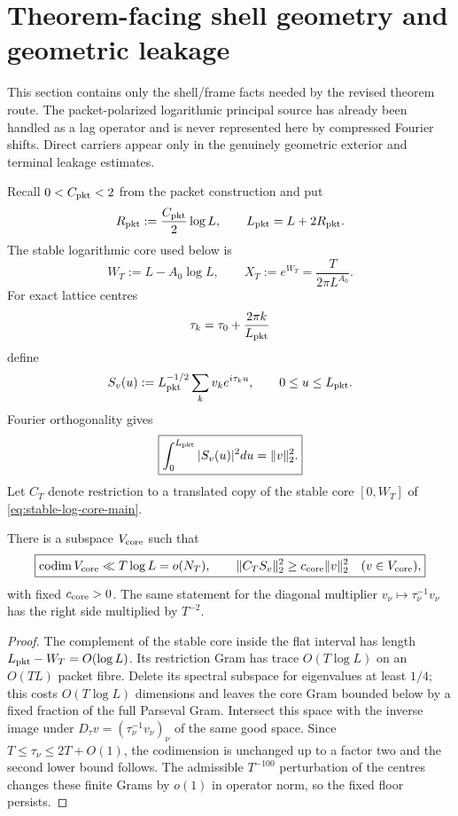 \section{Theorem-facing shell geometry and geometric leakage}
\label{sec:shell-frame}

This section contains only the shell/frame facts needed by the revised theorem
route.  The packet-polarized logarithmic principal source has already been
handled as a lag operator and is never represented here by compressed Fourier
shifts.  Direct carriers appear only in the genuinely geometric exterior and
terminal leakage estimates.

Recall $0<C_{\rm pkt}<2$ from the packet construction and put
\[
R_{\rm pkt}:=\frac{C_{\rm pkt}}2\log L,
\qquad
L_{\rm pkt}=L+2R_{\rm pkt}.
\]
The stable logarithmic core used below is
\begin{equation}
\boxed{
W_T:=L-A_0\log L,
\qquad
X_T:=e^{W_T}=\frac{T}{2\pi L^{A_0}}.
}
\label{eq:stable-log-core-main}
\end{equation}
For exact lattice centres
\[
\tau_k=\tau_0+\frac{2\pi k}{L_{\rm pkt}}
\]
define
\begin{equation}
S_v(u):=L_{\rm pkt}^{-1/2}\sum_kv_ke^{i\tau_ku},
\qquad 0\le u\le L_{\rm pkt}.
\label{eq:lattice-synthesis-shell}
\end{equation}
Fourier orthogonality gives
\begin{equation}
\boxed{
\int_0^{L_{\rm pkt}}|S_v(u)|^2du=\|v\|_2^2.
}
\label{eq:lattice-synthesis-isometry}
\end{equation}
Let $C_T$ denote restriction to a translated copy of the stable core
$[0,W_T]$ of \eqref{eq:stable-log-core-main}.

\begin{lemma}
\label{lem:stable-core-frame}
There is a subspace $V_{\rm core}$ such that
\begin{equation}
\boxed{
\operatorname{codim} V_{\rm core}\ll T\log L=o(N_T),
\qquad
\|C_TS_v\|_2^2\ge c_{\rm core}\|v\|_2^2
\quad(v\in V_{\rm core}),
}
\label{eq:stable-core-frame}
\end{equation}
with fixed $c_{\rm core}>0$.  The same statement for the diagonal multiplier
$v_\nu\mapsto\tau_\nu^{-1}v_\nu$ has the right side multiplied by $T^{-2}$.
\end{lemma}

\begin{proof}
The complement of the stable core inside the flat interval has length
$L_{\rm pkt}-W_T=O(\log L)$.  Its restriction Gram has trace
$O(T\log L)$ on an $O(TL)$ packet fibre.  Delete its spectral subspace for
eigenvalues at least $1/4$; this costs $O(T\log L)$ dimensions and leaves the
core Gram bounded below by a fixed fraction of the full Parseval Gram.
Intersect this space with the inverse image under
$D_\tau v=(\tau_\nu^{-1}v_\nu)_\nu$ of the same good space.  Since
$T\le\tau_\nu\le2T+O(1)$, the codimension is unchanged up to a factor two and
the second lower bound follows.  The admissible $T^{-100}$ perturbation of the
centres changes these finite Grams by $o(1)$ in operator norm, so the fixed
floor persists.
\end{proof}

